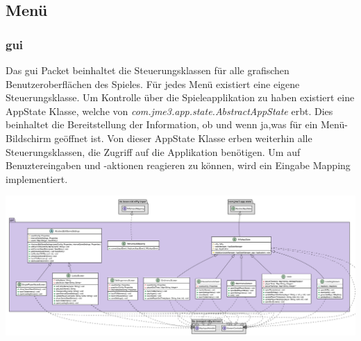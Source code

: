 \subsection{Menü}





\subsubsection{gui}\label{guipaket}
    Das gui Packet beinhaltet die Steuerungsklassen für alle grafischen
    Benutzeroberflächen des Spieles. Für jedes Menü existiert eine eigene
    Steuerungsklasse.
    Um Kontrolle über die Spieleapplikation zu haben existiert eine AppState Klasse, 
    welche von  \textit{com.jme3.app.state.AbstractAppState} erbt. Dies beinhaltet 
    die Bereitstellung der Information, ob und wenn ja,was für ein Menü-Bildschirm 
    geöffnet ist. Von dieser AppState Klasse erben weiterhin alle Steuerungsklassen, 
    die Zugriff auf die Applikation benötigen.
    Um auf Benuztereingaben und -aktionen reagieren zu können, wird ein
    Eingabe Mapping implementiert. \par

    \begin{center}
        \includegraphics[width=0.85\linewidth]{./GUI/GUI_Bilder/GUI.png}
        \label{fig:gui}
    \end{center}

        \pagebreak
